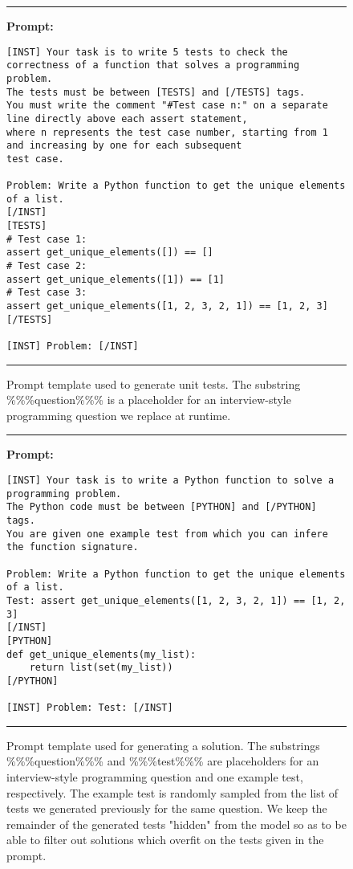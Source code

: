 \documentclass[10pt]{article}
\begin{document}
\begin{figure}[h!]
\small
\noindent\rule{\textwidth}{1pt}
   \textbf{Prompt:} 
\begin{verbatim}
[INST] Your task is to write 5 tests to check the correctness of a function that solves a programming 
problem. 
The tests must be between [TESTS] and [/TESTS] tags.
You must write the comment "#Test case n:" on a separate line directly above each assert statement, 
where n represents the test case number, starting from 1 and increasing by one for each subsequent 
test case.

Problem: Write a Python function to get the unique elements of a list.
[/INST]
[TESTS]
# Test case 1:
assert get_unique_elements([]) == []
# Test case 2:
assert get_unique_elements([1]) == [1]
# Test case 3:
assert get_unique_elements([1, 2, 3, 2, 1]) == [1, 2, 3]
[/TESTS]

[INST] Problem: [/INST]
\end{verbatim}

\noindent\rule{\textwidth}{1pt}

\caption{Prompt template used to generate unit tests. The substring \%\%\%question\%\%\% is a placeholder for an interview-style programming question we replace at runtime.
\label{fig:test_generation_prompts}}
\end{figure}


\begin{figure}[h!]
\small
\noindent\rule{\textwidth}{1pt}
   \textbf{Prompt:} 
\begin{verbatim}
[INST] Your task is to write a Python function to solve a programming problem.
The Python code must be between [PYTHON] and [/PYTHON] tags.
You are given one example test from which you can infere the function signature.

Problem: Write a Python function to get the unique elements of a list.
Test: assert get_unique_elements([1, 2, 3, 2, 1]) == [1, 2, 3]
[/INST]
[PYTHON]
def get_unique_elements(my_list):
    return list(set(my_list))
[/PYTHON]

[INST] Problem: Test: [/INST]
\end{verbatim}

\noindent\rule{\textwidth}{1pt}

\caption{Prompt template used for generating a solution. The substrings \%\%\%question\%\%\% and \%\%\%test\%\%\% are placeholders for an interview-style programming question and one example test, respectively. The example test is randomly sampled from the list of tests we generated previously for the same question. We keep the remainder of the generated tests "hidden" from the model so as to be able to filter out solutions which overfit on the tests given in the prompt.
\label{fig:sol_generation_prompts}}
\end{figure}
\end{document}
